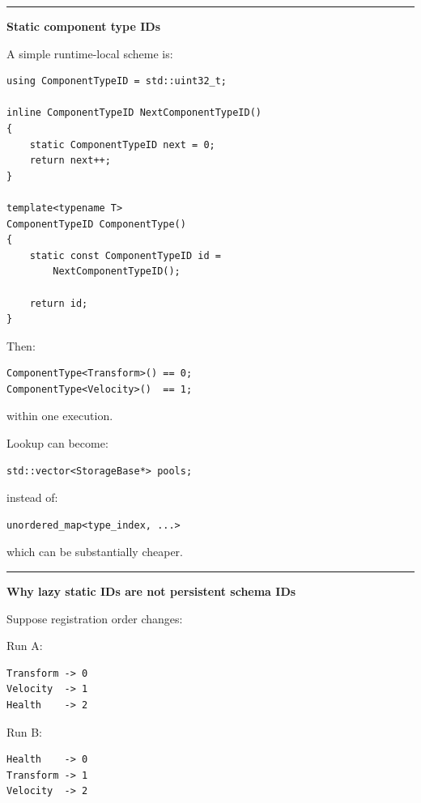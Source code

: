 \begin{center}\rule{0.5\linewidth}{0.5pt}\end{center}

\textbf{Static component type IDs}

A simple runtime-local scheme is:

\begin{verbatim}
using ComponentTypeID = std::uint32_t;

inline ComponentTypeID NextComponentTypeID()
{
    static ComponentTypeID next = 0;
    return next++;
}

template<typename T>
ComponentTypeID ComponentType()
{
    static const ComponentTypeID id =
        NextComponentTypeID();

    return id;
}
\end{verbatim}

Then:

\begin{verbatim}
ComponentType<Transform>() == 0;
ComponentType<Velocity>()  == 1;
\end{verbatim}

within one execution.

Lookup can become:

\begin{verbatim}
std::vector<StorageBase*> pools;
\end{verbatim}

instead of:

\begin{verbatim}
unordered_map<type_index, ...>
\end{verbatim}

which can be substantially cheaper.

\begin{center}\rule{0.5\linewidth}{0.5pt}\end{center}

\textbf{Why lazy static IDs are not persistent schema IDs}

Suppose registration order changes:

Run A:

\begin{verbatim}
Transform -> 0
Velocity  -> 1
Health    -> 2
\end{verbatim}

Run B:

\begin{verbatim}
Health    -> 0
Transform -> 1
Velocity  -> 2
\end{verbatim}

